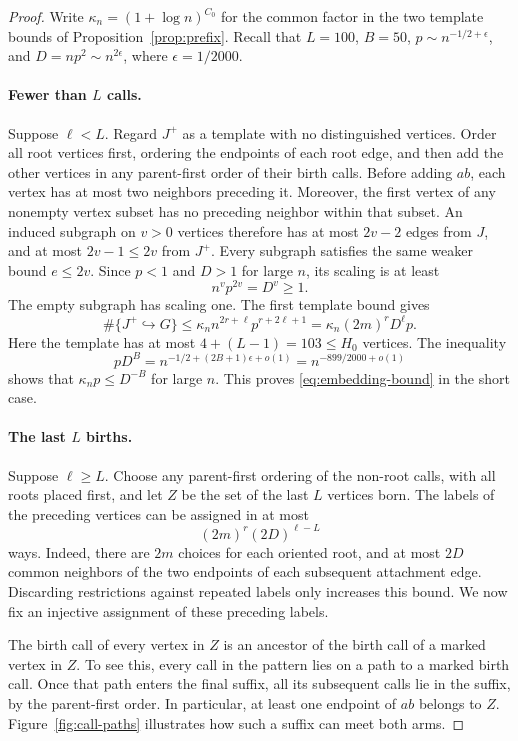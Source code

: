 \begin{proof}
Write $\kappa_n=(1+\log n)^{C_0}$ for the common factor in the two template
bounds of Proposition~\ref{prop:prefix}. Recall that $L=100$, $B=50$,
$p\sim n^{-1/2+\epsilon}$, and $D=np^2\sim n^{2\epsilon}$, where
$\epsilon=1/2000$.

\paragraph{Fewer than $L$ calls.}
Suppose $\ell<L$. Regard $J^+$ as a template with no distinguished
vertices. Order all root vertices first, ordering the endpoints of each
root edge, and then add the other vertices in any parent-first order of
their birth calls. Before adding $ab$, each vertex has at most two
neighbors preceding it. Moreover, the first vertex of any nonempty
vertex subset has no preceding neighbor within that subset. An induced
subgraph on $v>0$ vertices therefore has at most $2v-2$ edges from $J$,
and at most $2v-1\leq 2v$ from $J^+$. Every subgraph satisfies the same
weaker bound $e\leq 2v$. Since $p<1$ and $D>1$ for large $n$, its scaling
is at least
\[
 n^v p^{2v}=D^v\geq1.
\]
The empty subgraph has scaling one. The first template bound gives
\[
 \#\{J^+\hookrightarrow G\}
 \leq \kappa_n n^{2r+\ell}p^{r+2\ell+1}
 =\kappa_n(2m)^rD^\ell p.
\]
Here the template has at most $4+(L-1)=103\leq H_0$ vertices. The
inequality
\[
 pD^B=n^{-1/2+(2B+1)\epsilon+o(1)}
      =n^{-899/2000+o(1)}
\]
shows that $\kappa_np\leq D^{-B}$ for large $n$. This proves
\eqref{eq:embedding-bound} in the short case.

\paragraph{The last $L$ births.}
Suppose $\ell\geq L$. Choose any parent-first ordering of the non-root
calls, with all roots placed first, and let $Z$ be the set of the last
$L$ vertices born. The labels of the preceding vertices can be assigned
in at most
\begin{equation}\label{eq:preceding-labels}
 (2m)^r(2D)^{\ell-L}
\end{equation}
ways. Indeed, there are $2m$ choices for each oriented root, and at most
$2D$ common neighbors of the two endpoints of each subsequent attachment
edge. Discarding restrictions against repeated labels only increases this
bound. We now fix an injective assignment of these preceding labels.

The birth call of every vertex in $Z$ is an ancestor of the birth call
of a marked vertex in $Z$. To see this, every call in the pattern lies
on a path to a marked birth call. Once that path enters the final suffix,
all its subsequent calls lie in the suffix, by the parent-first order.
In particular, at least one endpoint of $ab$ belongs to $Z$.
Figure~\ref{fig:call-paths} illustrates how such a suffix can meet both arms.


\end{proof}
